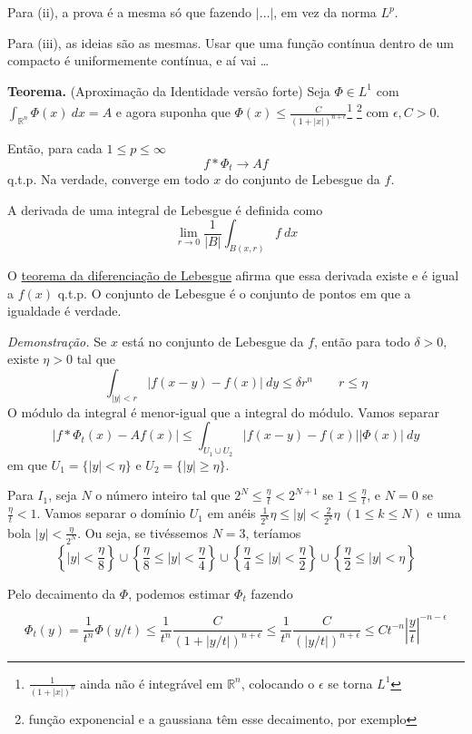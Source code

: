 \documentclass[11pt]{article}
\newcommand{\Rn}{{\mathbb{R}^n}}
\newcommand{\e}{\epsilon}
\begin{document}
Para (ii), a prova é a mesma só que fazendo \(\left|\ldots\right|\), em vez da norma \(L^p\).

Para (iii), as ideias são as mesmas. Usar que uma função contínua dentro de um compacto é uniformemente contínua, e aí vai \ldots


\textbf{Teorema.} (Aproximação da Identidade versão forte) Seja \(\Phi \in L^1\) com \(\int_\Rn \Phi(x)\ dx = A \) e agora suponha que \( \Phi(x) \leq \frac{C}{ (1 + |x|)^{n + \e} } \)\footnote{\(\frac{1}{(1+|x|)^n}\) ainda não é integrável em \(\Rn\), colocando o \(\e\) se torna \(L^1\)} \footnote{função exponencial e a gaussiana têm esse decaimento, por exemplo} com \(\e, C > 0\).

Então, para cada \(1 \leq p \leq \infty\) \[f * \Phi_t \rightarrow Af\] q.t.p. Na verdade, converge em todo \(x\) do conjunto de Lebesgue da \(f\).

A derivada de uma integral de Lebesgue é definida como \[\lim_{r \rightarrow 0} \frac{1}{|B|}\int_{B(x,r)} f\ dx \]

O \href{https://en.wikipedia.org/wiki/Lebesgue_differentiation_theorem}{teorema da diferenciação de Lebesgue} afirma que essa derivada existe e é igual a \(f(x)\) q.t.p. O conjunto de Lebesgue é o conjunto de pontos em que a igualdade é verdade.

\textit{Demonstração.} Se \(x\) está no conjunto de Lebesgue da \(f\), então para todo \(\delta > 0\), existe \(\eta>0\) tal que \[\int_{|y|<r} \left|f(x-y) -f(x) \right|\ dy \leq \delta r^n \qquad r\leq\eta\]
O módulo da integral é menor-igual que a integral do módulo. Vamos separar \[ \left| f * \Phi_t(x) - Af(x)\right| \leq \int_{U_1 \cup U_2} \left|f(x-y) -f(x)\right|\left|\Phi(x)\right|\ dy\] em que \(U_1 = \{ |y| < \eta\}\) e \(U_2 = \{|y| \geq \eta\}\).

Para \(I_1\), seja \(N\) o número inteiro tal que  \(2^N \leq \frac{\eta}{t} < 2^{N+1}\) se \(1 \leq \frac{\eta}{t}\), e \(N=0\) se \( \frac{\eta}{t} < 1\). Vamos separar o domínio \(U_1\) em anéis \(\frac{1}{2^k}\eta \leq |y| < \frac{2}{2^{k}}\eta \; (1 \leq k \leq N)\) e uma bola \(|y| < \frac{\eta}{2^N}\). Ou seja, se tivéssemos \(N=3\), teríamos
\[\left\{ |y| < \frac{\eta}{8} \right\}\cup\left\{ \frac{\eta}{8} \leq |y| < \frac{\eta}{4} \right\}\cup\left\{  \frac{\eta}{4} \leq |y| < \frac{\eta}{2} \right\}\cup\left\{  \frac{\eta}{2} \leq |y| < \eta\right\} \]

Pelo decaimento da \(\Phi\), podemos estimar \(\Phi_t\) fazendo

\[\Phi_t(y) = \frac{1}{t^n}\Phi(y/t)\leq \frac{1}{t^n}\frac{C}{ (1 + |y/t|)^{n + \e} } \leq  \frac{1}{t^n}\frac{C}{ (|y/t|)^{n + \e} } \leq Ct^{-n} \left|\frac{y}{t}\right|^{-n-\e}\]
\end{document}
